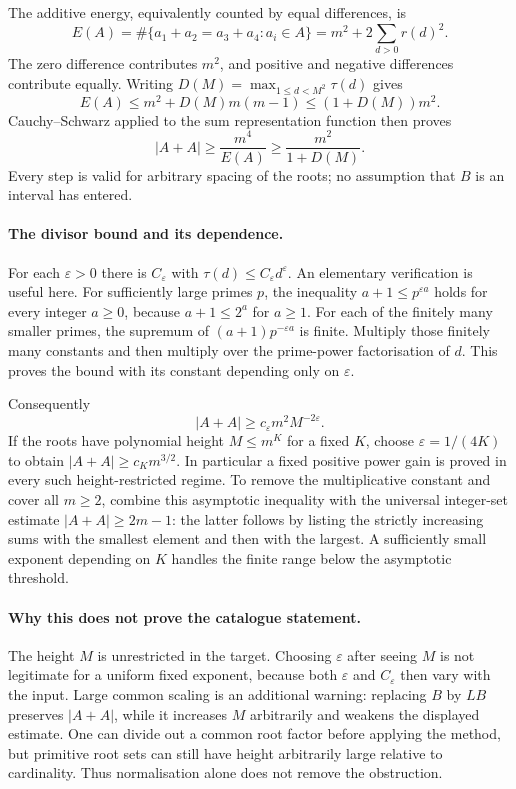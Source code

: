 \documentclass[11pt,a4paper]{article}
\begin{document}
The additive energy, equivalently counted by equal differences, is
\[
 E(A)=\#\{a_1+a_2=a_3+a_4:a_i\in A\}
     =m^2+2\sum_{d>0}r(d)^2.
\]
The zero difference contributes $m^2$, and positive and negative differences contribute equally. Writing $D(M)=\max_{1\leq d<M^2}\tau(d)$ gives
\[
 E(A)\leq m^2+D(M)m(m-1)\leq(1+D(M))m^2.
\]
Cauchy--Schwarz applied to the sum representation function then proves
\[
 |A+A|\geq\frac{m^4}{E(A)}\geq\frac{m^2}{1+D(M)}.
\]
Every step is valid for arbitrary spacing of the roots; no assumption that $B$ is an interval has entered.

\paragraph{The divisor bound and its dependence.}
For each $\varepsilon>0$ there is $C_\varepsilon$ with $\tau(d)\leq C_\varepsilon d^\varepsilon$. An elementary verification is useful here. For sufficiently large primes $p$, the inequality $a+1\leq p^{\varepsilon a}$ holds for every integer $a\geq0$, because $a+1\leq2^a$ for $a\geq1$. For each of the finitely many smaller primes, the supremum of $(a+1)p^{-\varepsilon a}$ is finite. Multiply those finitely many constants and then multiply over the prime-power factorisation of $d$. This proves the bound with its constant depending only on $\varepsilon$.

Consequently
\[
 |A+A|\geq c_\varepsilon m^2M^{-2\varepsilon}.
\]
If the roots have polynomial height $M\leq m^K$ for a fixed $K$, choose $\varepsilon=1/(4K)$ to obtain $|A+A|\geq c_Km^{3/2}$. In particular a fixed positive power gain is proved in every such height-restricted regime. To remove the multiplicative constant and cover all $m\geq2$, combine this asymptotic inequality with the universal integer-set estimate $|A+A|\geq2m-1$: the latter follows by listing the strictly increasing sums with the smallest element and then with the largest. A sufficiently small exponent depending on $K$ handles the finite range below the asymptotic threshold.

\paragraph{Why this does not prove the catalogue statement.}
The height $M$ is unrestricted in the target. Choosing $\varepsilon$ after seeing $M$ is not legitimate for a uniform fixed exponent, because both $\varepsilon$ and $C_\varepsilon$ then vary with the input. Large common scaling is an additional warning: replacing $B$ by $LB$ preserves $|A+A|$, while it increases $M$ arbitrarily and weakens the displayed estimate. One can divide out a common root factor before applying the method, but primitive root sets can still have height arbitrarily large relative to cardinality. Thus normalisation alone does not remove the obstruction.
\end{document}
